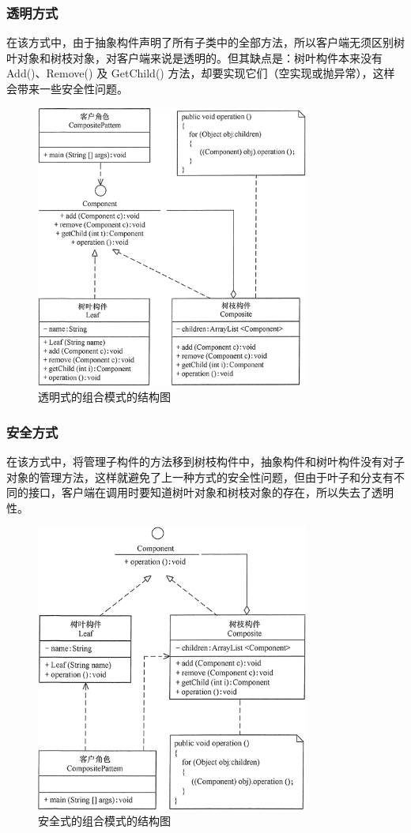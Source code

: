 \subsubsection{透明方式}
在该方式中，由于抽象构件声明了所有子类中的全部方法，所以客户端无须区别树叶对象和树枝对象，对客户端来说是透明的。但其缺点是：树叶构件本来没有 Add()、Remove() 及 GetChild() 方法，却要实现它们（空实现或抛异常），这样会带来一些安全性问题。
\begin{figure}[!h]
	\centering
	\includegraphics[width=0.8\textwidth]{image/11-1}
	\caption{透明式的组合模式的结构图}
\end{figure}
\subsubsection{安全方式}
在该方式中，将管理子构件的方法移到树枝构件中，抽象构件和树叶构件没有对子对象的管理方法，这样就避免了上一种方式的安全性问题，但由于叶子和分支有不同的接口，客户端在调用时要知道树叶对象和树枝对象的存在，所以失去了透明性。
\begin{figure}[!h]
	\centering
	\includegraphics[width=0.8\textwidth]{image/11-2}
	\caption{安全式的组合模式的结构图}
\end{figure}
